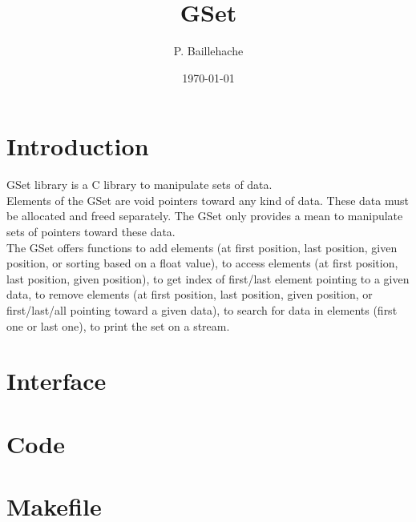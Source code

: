 \documentclass[12pt, a4paper]{article}
\begin{document}
\title{GSet}
\author{P. Baillehache}
\date{\today}
\maketitle

\tableofcontents

\section*{Introduction}

GSet library is a C library to manipulate sets of data.\\

Elements of the GSet are void pointers toward any kind of data. These data must be allocated and freed separately. The GSet only provides a mean to manipulate sets of pointers toward these data.\\

The GSet offers functions to add elements (at first position, last position, given position, or sorting based on a float value), to access elements (at first position, last position, given position), to get index of first/last element pointing to a given data, to remove elements (at first position, last position, given position, or first/last/all pointing toward a given data), to search for data in elements (first one or last one), to print the set on a stream.\\ 

\section{Interface}

\begin{scriptsize}
\begin{ttfamily}

\end{ttfamily}
\end{scriptsize}

\section{Code}

\begin{scriptsize}
\begin{ttfamily}

\end{ttfamily}
\end{scriptsize}


\section{Makefile}
\end{document}
